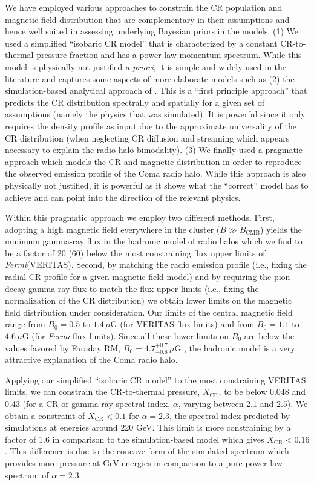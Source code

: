 \documentclass[12pt,manuscript]{aastex}
\def\Fermi{{\em Fermi}\xspace}
\newcommand{\rmn}{\mathrm}
\newcommand{\CR}{\mathrm{CR}}
\begin{document}
We have employed various approaches to constrain the CR population and magnetic field distribution
that are complementary in their assumptions and hence well suited in assessing underlying Bayesian
priors in the models. (1) We used a simplified ``isobaric CR model'' that is characterized by a
constant CR-to-thermal pressure fraction and has a power-law momentum spectrum. While this model
is physically not justified {\em a priori}, it is simple and widely used in the literature and
captures some aspects of more elaborate models such as (2) the simulation-based analytical approach 
of \citet{article:PinzkePfrommer:2010}. This is a ``first principle approach'' that predicts the CR
distribution spectrally and spatially for a given set of assumptions (namely the physics that was
simulated). It is powerful since it only requires the density profile as input due to the
approximate universality of the CR distribution (when neglecting CR diffusion and streaming which
appears necessary to explain the radio halo bimodality). (3) We finally used a pragmatic
approach which models the CR and magnetic distribution in order to reproduce the observed emission
profile of the Coma radio halo. While this approach is also physically not justified, it is
powerful as it shows what the ``correct'' model has to achieve and can point into the direction of
the relevant physics.

Within this pragmatic approach we employ two different methods. First, adopting a high magnetic
field everywhere in the cluster ($B\gg B_\rmn{CMB}$) yields the minimum gamma-ray flux in the
hadronic model of radio halos which we find to be a factor of 20 (60) below the most constraining
flux upper limits of \Fermi (VERITAS). Second, by matching the radio emission profile (i.e.,
fixing the radial CR profile for a given magnetic field model) and by requiring the pion-decay
gamma-ray flux to match the flux upper limits (i.e., fixing the normalization of the CR
distribution) we obtain lower limits on the magnetic field distribution under consideration. Our
limits of the central magnetic field range from $B_{0} = 0.5$ to $1.4\,\mu$G (for VERITAS  flux
limits) and from $B_{0} = 1.1$ to $4.6\,\mu$G (for \Fermi flux limits). Since all these lower
limits on $B_0$ are below the values favored by Faraday RM, $B_{0} = 4.7^{+0.7}_{-0.8}\,\mu$G
\citep{article:Bonafede_etal:2010}, the hadronic model is a very attractive explanation of the Coma
radio halo.

Applying our simplified ``isobaric CR model'' to the most constraining VERITAS limits, we can
constrain the CR-to-thermal pressure, $X_\CR$, to be below 0.048 and 0.43 (for a CR or gamma-ray
spectral index, $\alpha$, varying between 2.1 and 2.5). We obtain a constraint of $X_\CR<0.1$ for
$\alpha=2.3$, the spectral index predicted by simulations at energies around 220 GeV.  This limit is
more constraining by a factor of 1.6 in comparison to the simulation-based model which gives
$X_\CR<0.16$. This difference is due to the concave form of the simulated spectrum which provides
more pressure at GeV energies in comparison to a pure power-law spectrum of $\alpha=2.3$.
\end{document}
